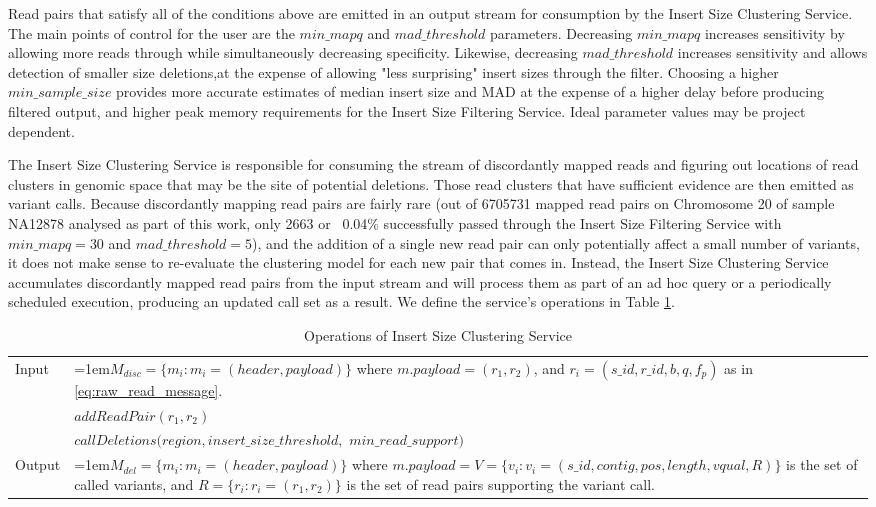Read pairs that satisfy all of the conditions above are emitted in an output stream for consumption by the Insert Size Clustering Service. The main points of control for the user are the $min\_mapq$ and $mad\_threshold$ parameters. Decreasing $min\_mapq$ increases sensitivity by allowing more reads through while simultaneously decreasing specificity. Likewise, decreasing $mad\_threshold$ increases sensitivity and allows detection of smaller size deletions,at the expense of allowing "less surprising" insert sizes through the filter. Choosing a higher $min\_sample\_size$ provides more accurate estimates of median insert size and MAD at the expense of a higher delay before producing filtered output, and higher peak memory requirements for the Insert Size Filtering Service. Ideal parameter values may be project dependent.

The Insert Size Clustering Service is responsible for consuming the stream of discordantly mapped reads and figuring out locations of read clusters in genomic space that may be the site of potential deletions. Those read clusters that have sufficient evidence are then emitted as variant calls. Because discordantly mapping read pairs are fairly rare (out of 6705731 mapped read pairs on Chromosome 20 of sample NA12878 analysed as part of this work, only 2663 or ~0.04\% successfully passed through the Insert Size Filtering Service with $min\_mapq=30$ and $mad\_threshold=5$), and the addition of a single new read pair can only potentially affect a small number of variants, it does not make sense to re-evaluate the clustering model for each new pair that comes in. Instead, the Insert Size Clustering Service accumulates discordantly mapped read pairs from the input stream and will process them as part of an ad hoc query or a periodically scheduled execution, producing an updated call set as a result. We define the service's operations in Table \ref{tab:op_insert_size_clustering}.

\bgroup
\def\arraystretch{1.5}
\begin{table}[!h]
    \caption{Operations of Insert Size Clustering Service}
    \label{tab:op_insert_size_clustering}
    {\begin{tabular}{l|p{12cm}}
    \toprule
    \multirow{2}{*}{Input} & \hangindent=1em$M_{disc} = \{m_i: m_i = (header, payload)\}$ where $m.payload = (r_1,r_2)$, and $r_i = (s\_id, r\_id, b, q, f_p)$ as in \ref{eq:raw_read_message}. \\
    \cline{2-2}
    \multirow{2}{*}{Operations} & $addReadPair(r_1,r_2)$\\
    & $callDeletions(region, insert\_size\_threshold,$ $min\_read\_support)$\\
    \cline{2-2}
    \multirow{2}{*}{Output} & \hangindent=1em$M_{del} = \{m_i: m_i = (header, payload)\}$ where $m.payload = V = \{v_i: v_i = (s\_id, contig, pos, length, vqual, R)\}$ is the set of called variants, and $R = \{r_i: r_i = (r_1,r_2)\}$ is the set of read pairs supporting the variant call.\\ 
    \bottomrule
    \end{tabular}}
\end{table}
\egroup

